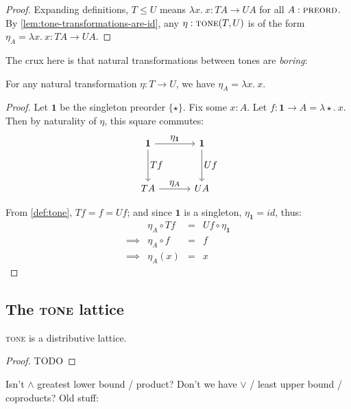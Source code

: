 \documentclass[ribbons]{rntz}
\newcommand{\todo}[1]{{\color{Purple}#1}}
\newcommand{\mb}[1]{\ensuremath{\mathbf{#1}}}
\newcommand{\mi}[1]{\ensuremath{\mathit{#1}}}
\newcommand{\fn}{\lambda}
\newcommand{\binder}{.~}
\newcommand{\bind}[1]{{#1}\binder}
\newcommand{\fnof}[1]{\fn\bind{#1}}
\newcommand{\cat}[1]{\textsc{#1}} %
\newcommand{\Pre}{\cat{preord}}
\newcommand{\Tone}{\cat{tone}}
\newcommand{\idfn}{\mi{id}}
\newcommand{\toneof}[2]{#1 #2}
\newcommand{\tmeet}{\wedge}                  %
\begin{document}
\begin{proof}
  Expanding definitions, $T \le U$ means $\fnof{x} x : \toneof{T}{A} \to
  \toneof{U}{A}$ for all $A : \Pre$. By \cref{lem:tone-transformations-are-id},
  any $\eta : \Tone(T,U)$ is of the form $\eta_A = \fnof{x} x : \toneof{T}{A}
  \to \toneof{U}{A}$.
\end{proof}

The crux here is that natural transformations between tones are \emph{boring}:
\begin{lemma}\label{lem:tone-transformations-are-id}
  For any natural transformation $\eta : T \to U$, we have $\eta_A = \fnof{x}
  x$.
\end{lemma}

\begin{proof}
  Let $\mb{1}$ be the singleton preorder $\{\star\}$. Fix some $x : A$. Let $f :
  \mb{1} \to A = \fnof{\star}{x}$. Then by naturality of $\eta$, this square
  commutes:
  \[\tikzset{
    no line/.style={draw=none,
      commutative diagrams/every label/.append style={/tikz/auto=false}}}
  \begin{tikzcd}[sep=3.3em]
    \mb{1} \arrow[r,"\textstyle \eta_{\mb{1}}"] \arrow[d,"\textstyle Tf"]
    & \mb{1} \arrow[d,"\textstyle Uf"]
    \\ TA \arrow[r,"\textstyle\eta_A"]
    & UA
  \end{tikzcd}\]

From \cref{def:tone}, $Tf = f = Uf$; and since $\mb{1}$ is
a singleton, $\eta_{\mb{1}} = \idfn$, thus:
  \[\begin{array}{rlcl}
  & \eta_A \circ Tf &=& Uf \circ \eta_{\mb{1}}\\
  \implies & \eta_A \circ f &=& f\\
  \implies & \eta_A(x) &=& x
  \end{array}\]
\end{proof}


\subsection{The \Tone{} lattice}

\begin{conjecture}
  \Tone{} is a distributive lattice.
\end{conjecture}
\begin{proof}
  \todo{TODO}
\end{proof}

\todo{Isn't $\tmeet$ greatest lower bound / product? Don't we have
  $\vee$ / least upper bound / coproducts? Old stuff:}
\end{document}
